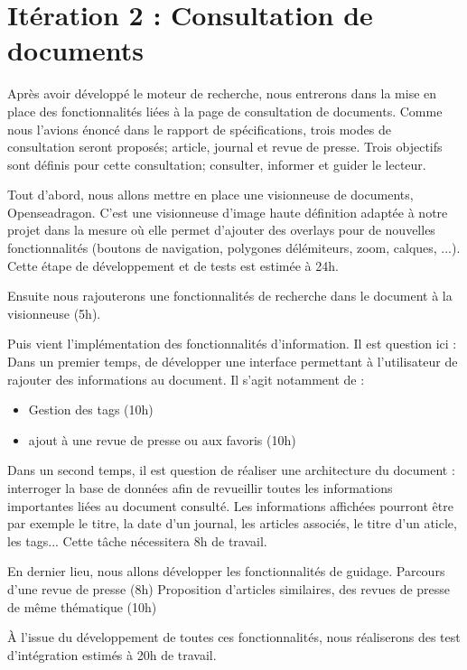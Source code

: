 \section{Itération 2 : Consultation de documents}

	Après avoir développé le moteur de recherche, nous entrerons dans la mise en place des fonctionnalités liées à la page de consultation de documents. Comme nous l'avions énoncé dans le rapport de spécifications, trois modes de consultation seront proposés; article, journal et revue de presse. Trois objectifs sont définis pour cette consultation; consulter, informer et guider le lecteur.

	Tout d'abord, nous allons mettre en place une visionneuse de documents, Openseadragon. C'est une visionneuse d'image haute définition adaptée à notre projet dans la mesure où elle permet d'ajouter des overlays pour de nouvelles fonctionnalités (boutons de navigation, polygones délémiteurs, zoom, calques, ...). Cette étape de développement et de tests est estimée à 24h.

	Ensuite nous rajouterons une fonctionnalités de recherche dans le document à la visionneuse (5h).

	Puis vient l'implémentation des fonctionnalités d'information. Il est question ici :
	Dans un premier temps, de développer une interface permettant à l'utilisateur de rajouter des informations au document. Il s'agit notamment de :
		\begin{itemize}
		\item Gestion des tags (10h)
		\item ajout à une revue de presse ou aux favoris (10h)
		\end{itemize}

	Dans un second temps, il est question de réaliser une architecture du document : interroger la base de données afin de revueillir toutes les informations importantes liées au document consulté. Les informations affichées pourront être par exemple le titre, la date d'un journal, les articles associés, le titre d'un aticle, les tags... Cette tâche nécessitera 8h de travail.

	En dernier lieu, nous allons développer les fonctionnalités de guidage.
	Parcours d'une revue de presse (8h)
	Proposition d'articles similaires, des revues de presse de même thématique (10h)

	À l'issue du développement de toutes ces fonctionnalités, nous réaliserons des test d'intégration estimés à 20h de travail.